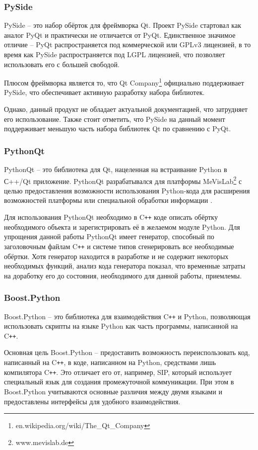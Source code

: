 \documentclass[14pt]{matmex-diploma-custom}
\begin{document}
\subsubsection{PySide}
PySide -- это набор обёрток для фреймворка Qt. Проект PySide стартовал как аналог PyQt и практически не отличается от PyQt. Единственное значимое отличие -- PyQt распространяется под коммерческой или GPLv3 лицензией, в то время как PySide распространяется под LGPL лицензией, что позволяет использовать его с большей свободой. 

Плюсом фреймворка является то, что Qt Company\footnote{en.wikipedia.org/wiki/The\_Qt\_Company} официально поддерживает PySide, что обеспечивает активную разработку набора библиотек. 

Однако, данный продукт не обладает актуальной документацией, что затрудняет его использование. Также стоит отметить, что PySide на данный момент поддерживает меньшую часть набора библиотек Qt по сравнению с PyQt.

\subsubsection{PythonQt}
PythonQt -- это библиотека для Qt, нацеленная на встраивание Python в С++/Qt приложение. PythonQt разрабатывался для платформы MeVisLab\footnote{www.mevislab.de} с целью предоставления возможности использования Python-кода для расширения возможностей платформы или специальной обработки информации \cite{heckelMeVisLab}. 

Для использования PythonQt необходимо в C\texttt{++} коде описать обёртку необходимого объекта и зарегистрировать её в желаемом модуле Python. Для упрощения данной работы PythonQt имеет генератор, способный по заголовочным файлам C\texttt{++} и системе типов сгенерировать все необходимые обёртки. Хотя генератор находится в разработке и не содержит некоторых необходимых функций, анализ кода генератора показал, что временные затраты на доработку его до состояния, необходимого для данной работы, приемлемы.

\subsubsection{Boost.Python}
Boost.Python \cite{abrahams2003boost} -- это библиотека для взаимодействия C\texttt{++} и Python, позволяющая использовать скрипты на языке Python как часть программы, написанной на C\texttt{++}. 

Основная цель Boost.Python -- предоставить возможность переиспользовать код, написанный на C\texttt{++}, в коде, написанном на Python, средствами лишь компилятора C\texttt{++}. Это отличает его от, например, SIP, который использует специальный язык для создания промежуточной коммуникации. При этом в Boost.Python учитываются основные различия между двумя языками и предоставлены интерфейсы для удобного взаимодействия.
\end{document}
